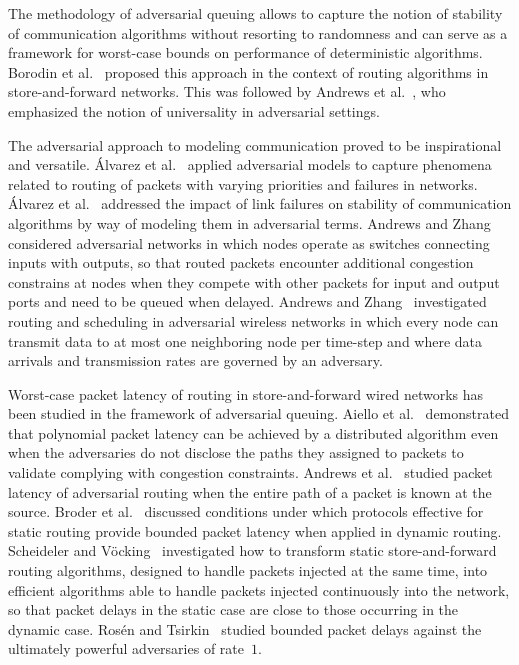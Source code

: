 \documentclass[11pt]{article}
\begin{document}
The methodology of adversarial queuing allows to capture the notion of stability of communication algorithms without resorting to randomness and can serve as a framework for worst-case bounds on performance of deterministic algorithms.
Borodin et al.~\cite{BorodinKRSW01} proposed this approach in the context of routing algorithms in store-and-forward networks. 
This was followed by Andrews et al.~\cite{AndrewsAFLLK01}, who emphasized the notion of universality in adversarial settings.

The adversarial approach to modeling communication proved to be inspirational and  versatile.
\'Alvarez et al.~\cite{AlvarezBDSF05} applied adversarial models to capture phenomena related to routing of packets with varying priorities and failures in networks.
\'Alvarez et al.~\cite{AlvarezBS-ICPADS04} addressed the impact of link failures on stability of communication algorithms by way of modeling them in adversarial terms.
Andrews and Zhang~\cite{AndrewsZ03} considered adversarial networks in which nodes operate as switches connecting inputs with outputs, so that routed packets encounter additional congestion constrains at nodes when they compete with other packets for input and output ports and need to be queued when delayed.
Andrews and Zhang~\cite{AndrewsZ07} investigated routing and scheduling in adversarial wireless networks in which every node can transmit data to at most one neighboring node per time-step and where data arrivals and transmission rates are governed by an adversary.


Worst-case packet latency of routing in store-and-forward wired networks has been studied in the framework of adversarial queuing.
Aiello et al.~\cite{AielloKOR-JCSS00} demonstrated that polynomial packet latency can be achieved by a distributed algorithm even when the adversaries do not disclose the paths they assigned to packets to validate complying with congestion constraints.
Andrews et al.~\cite{AndrewsFGZ-JACM05} studied packet latency of adversarial routing when the entire path of a packet is known at the source.
Broder et al.~\cite{BroderFU01} discussed conditions under which protocols effective for static routing provide bounded packet latency when applied in dynamic routing.
Scheideler and V\"ocking~\cite{ScheidelerV98} investigated how to transform static store-and-forward routing algorithms, designed to handle packets injected at the same time,  into efficient algorithms able to handle packets injected continuously into the network, so that packet delays in the static case are close to those occurring in the dynamic case.
Ros\'en and Tsirkin~\cite{RosenT06} studied bounded packet delays against the ultimately powerful adversaries of rate~$1$.
\end{document}
